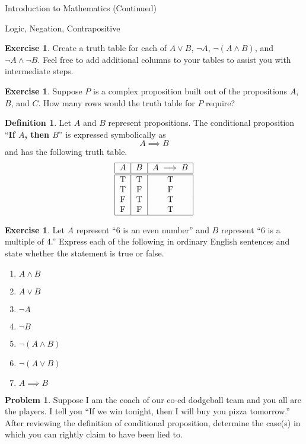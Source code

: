 \documentclass[11pt]{article}
\theoremstyle{definition}
\newtheorem{definition}[theorem]{Definition}
\newtheorem{exercise}[theorem]{Exercise}
\newtheorem{problem}[theorem]{Problem}
\begin{document}
\begin{section}{Introduction to Mathematics (Continued)}
\begin{subsection}{Logic, Negation, Contrapositive}
\begin{exercise}
Create a truth table for each of $A \vee B$, $\neg A$, $\neg (A \wedge B)$, and $\neg A \wedge \neg B$.  Feel free to add additional columns to your tables to assist you with intermediate steps.
\end{exercise}

\begin{exercise}
Suppose $P$ is a complex proposition built out of the propositions $A$, $B$, and $C$.  How many rows would the truth table for $P$ require?
\end{exercise}

\begin{definition}\label{def:conditional}
Let $A$ and $B$ represent propositions.  The conditional proposition ``\textbf{If $A$, then $B$}'' is expressed symbolically as 
\[
A \implies B
\]
and has the following truth table.
\[
\begin{tabular}{| c | c  | c |} \hline
$A$  &  $B$ & $A \implies B$  \\ \hline\hline
T & T & T  \\ 
T & F & F  \\ 
F & T & T  \\ 
F & F & T  \\ \hline
\end{tabular}
\]
\end{definition}

\begin{exercise}\label{exer:translations}
Let $A$ represent ``6 is an even number'' and $B$ represent ``6 is a multiple of 4.''  Express each of the following in ordinary English sentences and state whether the statement is true or false.
\begin{enumerate}
  \item $A \wedge B$
  \item $A \vee B$
  \item $\neg A$
  \item $\neg B$
  \item $\neg (A \wedge B)$
  \item $\neg (A \vee B)$
  \item $A \implies B$
\end{enumerate}
\end{exercise}

\begin{problem}
Suppose I am the coach of our co-ed dodgeball team and you all are the players.  I tell you ``If we win tonight, then I will buy you pizza tomorrow.''  After reviewing the definition of conditional proposition, determine the case(s) in which you can rightly claim to have been lied to.
\end{problem}


\end{subsection}
\end{section}
\end{document}
